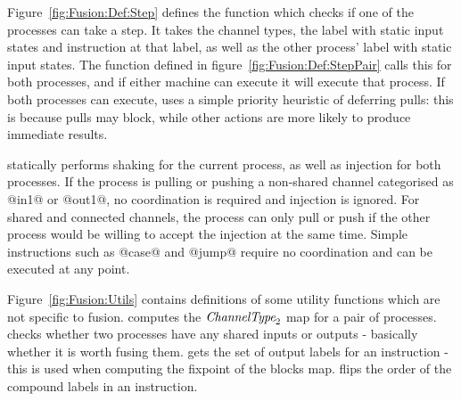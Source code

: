 Figure~\ref{fig:Fusion:Def:Step} defines the  function which checks if one of the processes can take a step.
It takes the channel types, the label with static input states and instruction at that label, as well as the other process' label with static input states.
The  function defined in figure~\ref{fig:Fusion:Def:StepPair} calls this for both processes, and if either machine can execute it will execute that process.
If both processes can execute,  uses a simple priority heuristic of deferring pulls: this is because pulls may block, while other actions are more likely to produce immediate results.

 statically performs shaking for the current process, as well as injection for both processes.
If the process is pulling or pushing a non-shared channel categorised as @in1@ or @out1@, no coordination is required and injection is ignored.
For shared and connected channels, the process can only pull or push if the other process would be willing to accept the injection at the same time.
Simple instructions such as @case@ and @jump@ require no coordination and can be executed at any point.



Figure~\ref{fig:Fusion:Utils} contains definitions of some utility functions which are not specific to fusion.
 computes the $\textit{ChannelType}_2$ map for a pair of processes.
 checks whether two processes have any shared inputs or outputs - basically whether it is worth fusing them.
 gets the set of output labels for an instruction - this is used when computing the fixpoint of the blocks map.
 flips the order of the compound labels in an instruction.
